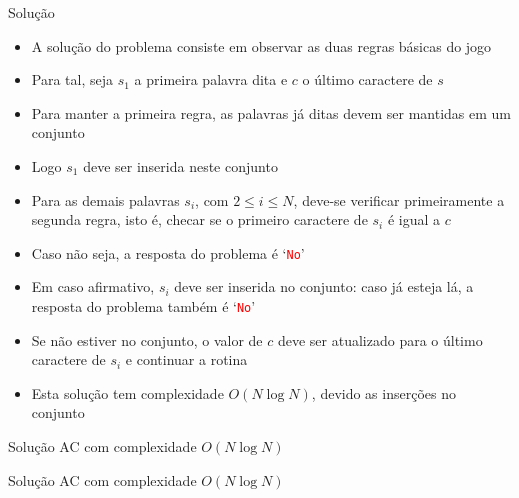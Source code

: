 \begin{frame}[fragile]{Solução}

    \begin{itemize}
        \item A solução do problema consiste em observar as duas regras básicas do jogo

        \item Para tal, seja $s_1$ a primeira palavra dita e $c$ o último caractere de $s$

        \item Para manter a primeira regra, as palavras já ditas devem ser mantidas em um
            conjunto

        \item Logo $s_1$ deve ser inserida neste conjunto

        \item Para as demais palavras $s_i$, com $2\leq i\leq N$, deve-se verificar primeiramente
            a segunda regra, isto é, checar se o primeiro caractere de  $s_i$ é igual a $c$

        \item Caso não seja, a resposta do problema é `\textcolor{red}{\texttt{No}}'

        \item Em caso afirmativo, $s_i$ deve ser inserida no conjunto: caso já esteja lá,
            a resposta do problema também é `\textcolor{red}{\texttt{No}}'

        \item Se não estiver no conjunto, o valor de $c$ deve ser atualizado para o último
            caractere de $s_i$ e continuar a rotina

        \item Esta solução tem complexidade $O(N\log N)$, devido as inserções no conjunto
    \end{itemize}

\end{frame}


\begin{frame}[fragile]{Solução AC com complexidade $O(N\log N)$}
\end{frame}

\begin{frame}[fragile]{Solução AC com complexidade $O(N\log N)$}
\end{frame}
